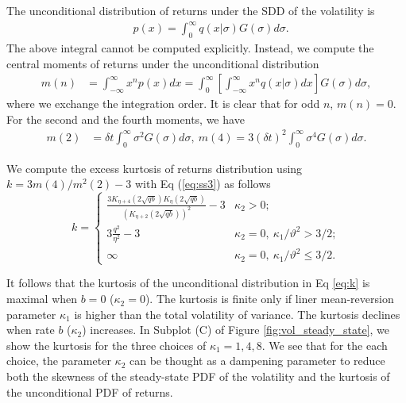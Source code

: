 \documentclass[pdftex,11pt,a4paper] {article}
\begin{document}
The unconditional distribution of returns under the SDD of the volatility is
\begin{equation}
\begin{split}
& p(x) = \int^{\infty}_{0}  q(x\left.\right|\sigma) G(\sigma)d\sigma.
\end{split}
\end{equation}
The above integral cannot be computed explicitly. Instead, we compute the central moments of returns under the unconditional distribution
\begin{equation}
\begin{split}
m(n) & = \int^{\infty}_{-\infty}x^{n}p(x) dx = \int^{\infty}_{0}  \left[ \int^{\infty}_{-\infty}x^{n} q(x\left.\right|\sigma)dx\right] G(\sigma)d\sigma,
\end{split}
\end{equation}
where we exchange the integration order. It is clear that for odd $n$, $m(n)=0$. For the second and the fourth moments, we have
\begin{equation}
\begin{split}
m(2) & =  \delta t\int^{\infty}_{0} \sigma^{2} G(\sigma)d\sigma, \ m(4) =  3(\delta t)^{2}\int^{\infty}_{0} \sigma^{4} G(\sigma)d\sigma.
\end{split}
\end{equation}


We compute the excess kurtosis of returns distribution using $k=3m(4)/m^{2}(2)-3$ with Eq (\ref{eq:ss3}) as follows
\begin{equation} \label{eq:k}
k= \begin{cases} 
      \frac{3K_{\eta+4}\left(2\sqrt{qb}\right)K_{\eta}\left(2\sqrt{qb}\right)}{\left(K_{\eta+2}\left(2\sqrt{qb}\right)\right)^2} -3 & \kappa_{2}>0; \\
      3\frac{q^{2}}{\eta^{2}} - 3 & \kappa_{2} = 0, \  \kappa_{1}/\vartheta^{2}>3/2; \\
      \infty & \kappa_{2} = 0, \  \kappa_{1}/\vartheta^{2} \leq 3/2.
   \end{cases}
\end{equation}


It follows that the kurtosis of the unconditional distribution in Eq \eqref{eq:k} is maximal when $b=0$ ($\kappa_{2}=0$). The kurtosis is finite only if liner mean-reversion parameter $\kappa_{1}$ is higher than the total volatility of variance. The kurtosis declines when rate $b$ ($\kappa_{2}$) increases. In Subplot (C) of Figure \ref{fig:vol_steady_state}, we show the kurtosis for the three choices of $\kappa_{1}=1, 4, 8$. We see that for the each choice, the parameter $\kappa_2$ can be thought as a dampening parameter to reduce both the skewness of the steady-state PDF of the volatility and the kurtosis of the unconditional PDF of returns.
\end{document}
